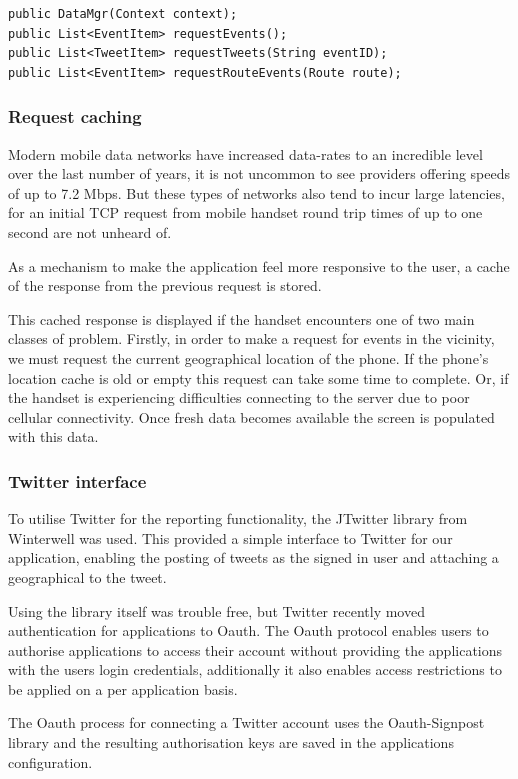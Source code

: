 \begin{lstlisting}
public DataMgr(Context context);
public List<EventItem> requestEvents();
public List<TweetItem> requestTweets(String eventID);
public List<EventItem> requestRouteEvents(Route route);
\end{lstlisting}

\subsubsection{Request caching}
Modern mobile data networks have increased data-rates to an incredible level
over the last number of years, it is not uncommon to see providers offering
speeds of up to 7.2 Mbps. But these types of networks also tend to incur large
latencies, for an initial TCP request from mobile handset round trip times of
up to one second are not unheard of.

As a mechanism to make the application feel more responsive to the user, a
cache of the response from the previous request is stored.

This cached response is displayed if the handset encounters one of two main
classes of problem. Firstly, in order to make a request for events in the
vicinity, we must request the current geographical location of the phone. If
the phone's location cache is old or empty this request can take some time to
complete. Or, if the handset is experiencing difficulties connecting to
the server due to poor cellular connectivity. Once fresh data becomes available
the screen is populated with this data. 

\subsubsection{Twitter interface}
To utilise Twitter for the reporting functionality, the JTwitter library from
Winterwell was used. This provided a simple interface to Twitter for our
application, enabling the posting of tweets as the signed in user and attaching
a geographical to the tweet.

Using the library itself was trouble free, but Twitter recently moved
authentication for applications to Oauth. The Oauth protocol enables users to
authorise applications to access their account without providing the
applications with the users login credentials, additionally it also enables
access restrictions to be applied on a per application basis.

The Oauth process for connecting a Twitter account uses the Oauth-Signpost
library and the resulting authorisation keys are saved in the applications
configuration. 

